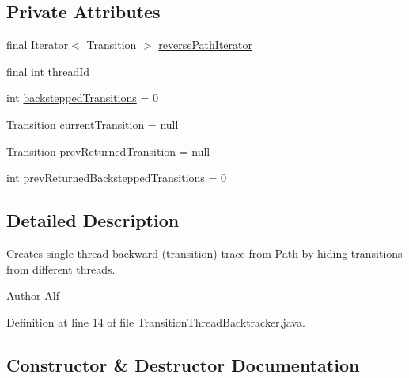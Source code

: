 \subsection*{Private Attributes}
\begin{DoxyCompactItemize}
\item 
final Iterator$<$ Transition $>$ \hyperlink{classgov_1_1nasa_1_1jpf_1_1inspector_1_1server_1_1pathanalysis_1_1_transition_thread_backtracker_aba5dcd1646802854653af84fd5e420b5}{reverse\+Path\+Iterator}
\item 
final int \hyperlink{classgov_1_1nasa_1_1jpf_1_1inspector_1_1server_1_1pathanalysis_1_1_transition_thread_backtracker_ab5825d940eb7057fe8f2493e2c9baa14}{thread\+Id}
\item 
int \hyperlink{classgov_1_1nasa_1_1jpf_1_1inspector_1_1server_1_1pathanalysis_1_1_transition_thread_backtracker_abfd6313c73f25511f92f2e6a755c335c}{backstepped\+Transitions} = 0
\item 
Transition \hyperlink{classgov_1_1nasa_1_1jpf_1_1inspector_1_1server_1_1pathanalysis_1_1_transition_thread_backtracker_a226a7f84b473fcf5973e9ce6896c5735}{current\+Transition} = null
\item 
Transition \hyperlink{classgov_1_1nasa_1_1jpf_1_1inspector_1_1server_1_1pathanalysis_1_1_transition_thread_backtracker_a188efd2f5bf48d8c71943789a66b3219}{prev\+Returned\+Transition} = null
\item 
int \hyperlink{classgov_1_1nasa_1_1jpf_1_1inspector_1_1server_1_1pathanalysis_1_1_transition_thread_backtracker_a08629010f6db8d01a84a5e2d0154a936}{prev\+Returned\+Backstepped\+Transitions} = 0
\end{DoxyCompactItemize}


\subsection{Detailed Description}
Creates single thread backward (transition) trace from \hyperlink{}{Path} by hiding transitions from different threads. 

\begin{DoxyAuthor}{Author}
Alf 
\end{DoxyAuthor}


Definition at line 14 of file Transition\+Thread\+Backtracker.\+java.



\subsection{Constructor \& Destructor Documentation}
